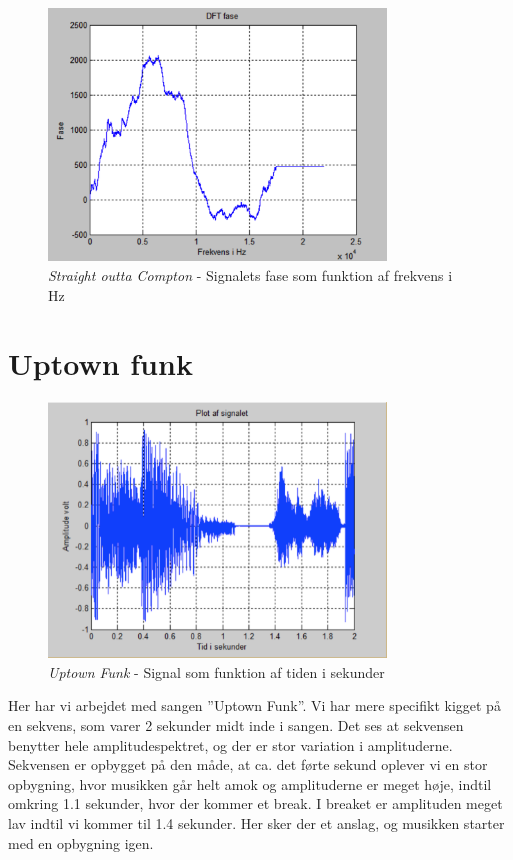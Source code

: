 \begin{figure}[H]
	\centering
	\includegraphics[width=0.8\textwidth]{Figurer/Snip20151001_19}
	\caption{\textit{Straight outta Compton} - Signalets fase som funktion af frekvens i Hz}
\end{figure} 

\section{Uptown funk}

\begin{figure}[H]
	\centering
	\includegraphics[width=0.8\textwidth]{Figurer/UptownFunk}
	\caption{\textit{Uptown Funk} - Signal som funktion af tiden i sekunder}
\end{figure}

Her har vi arbejdet med sangen ”Uptown Funk”. Vi har mere specifikt kigget på en sekvens, som varer 2 sekunder midt inde i sangen. Det ses at sekvensen benytter hele amplitudespektret, og der er stor variation i amplituderne. Sekvensen er opbygget på den måde, at ca. det førte sekund oplever vi en stor opbygning, hvor musikken går helt amok og amplituderne er meget høje, indtil omkring 1.1 sekunder, hvor der kommer et break. I breaket er amplituden meget lav indtil vi kommer til 1.4 sekunder. Her sker der et anslag, og musikken starter med en opbygning igen. 

